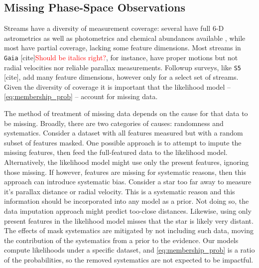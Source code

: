 \documentclass[twocolumn]{aastex631}
\newcommand{\dataarchive}[1]{\texttt{#1}}
\newcommand{\Gaia}{\dataarchive{Gaia}}
\newcommand{\TODO}[1]{{\textcolor{red}{#1}}}
\newcommand{\JN}[1]{\TODO{#1}}
\begin{document}
    \subsection{Missing Phase-Space Observations}
    \label{sub:method:missing_data}

        Streams have a diversity of measurement coverage: several have full 6-D
        astrometrics as well as photometrics and chemical abundances available
        \citep[e.g.,][]{Koposov+2019, Antoja+2020, Li+2022}, while most have
        partial coverage, lacking some feature dimensions.
        Most streams in \Gaia {\color{red} [cite]}\JN{Should be italics right?}, for instance, have proper
        motions but not radial velocities nor reliable parallax measurements.
        Followup surveys, like \dataarchive{S5} {\color{red} [cite]}, add many
        feature dimensions, however only for a select set of streams. Given the
        diversity of coverage it is important that the likelihood model --
        \autoref{eq:membership_prob} -- account for missing data.

        The method of treatment of missing data depends on the cause for that
        data to be missing.  Broadly, there are two categories of causes:
        randomness and systematics.  Consider a dataset with all features
        measured but with a random subset of features masked.  One possible
        approach is to attempt to impute the missing features, then feed the
        full-featured data to the likelihood model. Alternatively, the
        likelihood model might use only the present features, ignoring those
        missing. If however, features are missing for systematic reasons, then
        this approach can introduce systematic bias. Consider a star too far
        away to measure it's parallax distance or radial velocity. This is a
        systematic reason and this information should be incorporated into any
        model as a prior. Not doing so, the data imputation approach might
        predict too-close distances. Likewise, using only present features in
        the likelihood model misses that the star is likely very distant.  The
        effects of mask systematics are mitigated by not including such data,
        moving the contribution of the systematics from a prior to the evidence.
        Our models compute likelihoods under a specific dataset, and
        \autoref{eq:membership_prob} is a ratio of the probabilities, so the
        removed systematics are not expected to be impactful.
\end{document}
